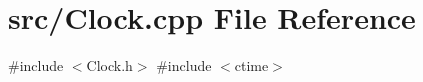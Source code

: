 \section{src/\+Clock.cpp File Reference}
\label{_clock_8cpp}
{\ttfamily \#include $<$Clock.\+h$>$}\newline
{\ttfamily \#include $<$ctime$>$}\newline
